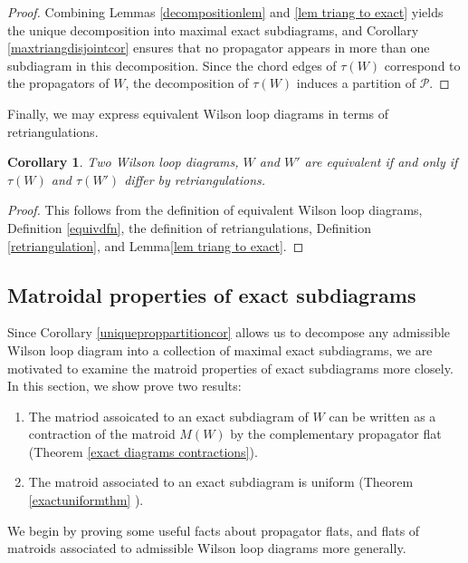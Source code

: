 \documentclass[11pt]{article}
\newcommand{\cP}{\mathcal{P}}
\newtheorem{cor}[thm]{Corollary}
\theoremstyle{remark}
\theoremstyle{definition}
\begin{document}
\begin{proof}
Combining Lemmas \ref{decompositionlem} and \ref{lem triang to exact} yields the unique decomposition into maximal exact subdiagrams, and Corollary \ref{maxtriangdisjointcor} ensures that no propagator appears in more than one subdiagram in this decomposition. Since the chord edges of $\tau(W)$ correspond to the propagators of $W$, the decomposition of $\tau(W)$ induces a partition of $\cP$.
\end{proof}

Finally, we may express equivalent Wilson loop diagrams in terms of retriangulations.

\begin{cor}\label{equialentretriangulation}
Two Wilson loop diagrams, $W$ and $W'$ are equivalent if and only if $\tau(W)$ and $\tau(W')$ differ by retriangulations.
\end{cor}

\begin{proof}
This follows from the definition of equivalent Wilson loop diagrams, Definition \ref{equivdfn}, the definition of retriangulations, Definition \ref{retriangulation}, and Lemma\ref{lem triang to exact}.
\end{proof}

\subsection{Matroidal properties of exact subdiagrams \label{sec: exact diagram matroidal props}}

Since Corollary \ref{uniqueproppartitioncor} allows us to decompose any admissible Wilson loop diagram into a collection of maximal exact subdiagrams, we are motivated to examine the matroid properties of exact subdiagrams more closely. In this section, we show prove two results:
\begin{enumerate}
\item The matriod assoicated to an exact subdiagram of $W$ can be written as a contraction of the matroid $M(W)$ by the complementary propagator flat (Theorem \ref{exact diagrams contractions}). 
\item The matroid associated to an exact subdiagram is uniform (Theorem \ref{exactuniformthm} ).
\end{enumerate}

We begin by proving some useful facts about propagator flats, and flats of matroids associated to admissible Wilson loop diagrams more generally.
\end{document}
